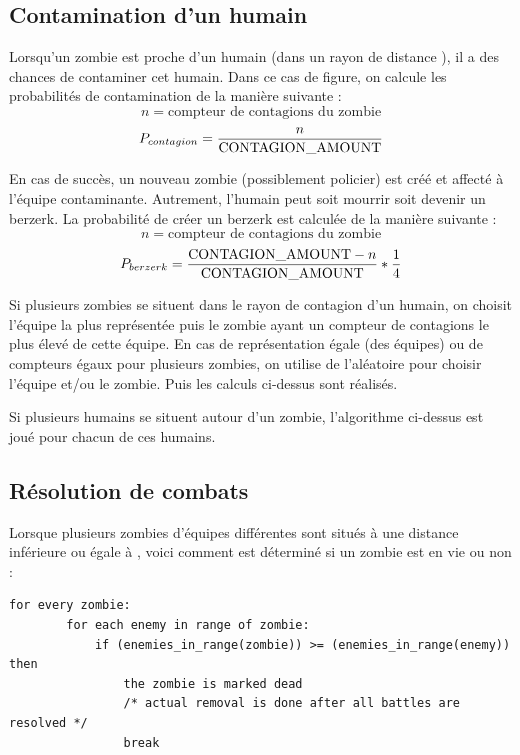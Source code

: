 
\subsection{Contamination d'un humain} %
\label{contagion}
Lorsqu'un zombie est proche d'un humain (dans un rayon de distance \contagionradius{}), il a des chances de contaminer cet humain.
Dans ce cas de figure, on calcule les probabilités de contamination de la manière suivante :\\
    $$n = \text{compteur de contagions du zombie}$$
    $$P_{contagion} = \frac{n}{\contagionamount}$$

En cas de succès, un nouveau zombie (possiblement policier) est créé et affecté à l'équipe contaminante.
Autrement, l'humain peut soit mourrir soit devenir un berzerk.
La probabilité de créer un berzerk est calculée de la manière suivante :\\
    $$n = \text{compteur de contagions du zombie}$$
    $$P_{berzerk} = \frac{\contagionamount - n}{\contagionamount} * \frac{1}{4}$$

Si plusieurs zombies se situent dans le rayon de contagion d'un humain, on choisit l'équipe la plus représentée puis le zombie ayant un compteur de contagions le plus élevé de cette équipe.
En cas de représentation égale (des équipes) ou de compteurs égaux pour plusieurs zombies, on utilise de l'aléatoire pour choisir l'équipe et/ou le zombie.
Puis les calculs ci-dessus sont réalisés.

Si plusieurs humains se situent autour d'un zombie, l'algorithme ci-dessus est joué pour chacun de ces humains.



\subsection{Résolution de combats} %

Lorsque plusieurs zombies d'équipes différentes sont situés à une distance inférieure ou égale à \attackradius{}, voici comment est déterminé si un zombie est en vie ou non :

\begin{lstlisting}[caption=Résolution de combats, columns=fullflexible]
for every zombie:
        for each enemy in range of zombie:
            if (enemies_in_range(zombie)) >= (enemies_in_range(enemy)) then
                the zombie is marked dead
                /* actual removal is done after all battles are resolved */
                break
    
\end{lstlisting}

